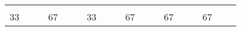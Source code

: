 \begin{landscape}
\begin{table}[h!]
\begin{tabular}{lcllcllcllcllcllcl}
\multicolumn{1}{l|}{}     & \multicolumn{1}{c|}{}                                                                                                   &                              & \multicolumn{1}{l|}{}   & \multicolumn{1}{c|}{}                                                                                                      &                               & \multicolumn{1}{l|}{}   & \multicolumn{1}{c|}{}                                                                                                   &                               & \multicolumn{1}{l|}{}   & \multicolumn{1}{c|}{}                                                                                            &                               & \multicolumn{1}{l|}{}   & \multicolumn{1}{c|}{}                                                                                                              &                               & \multicolumn{1}{l|}{}   & \multicolumn{1}{c|}{}                                                                                                        &                               \\ \cline{1-1} \cline{3-4} \cline{6-7} \cline{9-10} \cline{12-13} \cline{15-16} \cline{18-18} 
\multicolumn{1}{|l|}{33}  & \multicolumn{1}{c|}{}                                                                                                   & \multicolumn{1}{l|}{}        & \multicolumn{1}{l|}{67} & \multicolumn{1}{c|}{}                                                                                                      & \multicolumn{1}{l|}{}         & \multicolumn{1}{l|}{33} & \multicolumn{1}{c|}{}                                                                                                   & \multicolumn{1}{l|}{}         & \multicolumn{1}{l|}{67} & \multicolumn{1}{c|}{}                                                                                            & \multicolumn{1}{l|}{}         & \multicolumn{1}{l|}{67} & \multicolumn{1}{c|}{}                                                                                                              & \multicolumn{1}{l|}{}         & \multicolumn{1}{l|}{67} & \multicolumn{1}{c|}{}                                                                                                        & \multicolumn{1}{l|}{}         \\ \hline

\end{tabular}
\end{table}
\end{landscape}
